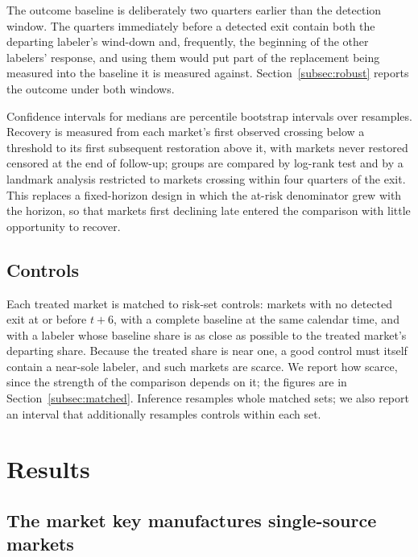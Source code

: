 \documentclass[pdflatex,sn-vancouver-num,Numbered]{sn-jnl}
\begin{document}
The outcome baseline is deliberately two quarters earlier than the detection window. The
quarters immediately before a detected exit contain both the departing labeler's wind-down and,
frequently, the beginning of the other labelers' response, and using them would put part of the
replacement being measured into the baseline it is measured against. Section~\ref{subsec:robust}
reports the outcome under both windows.

Confidence intervals for medians are percentile bootstrap intervals over \nBootDraws resamples.
Recovery is measured from each market's first observed crossing below a threshold to its first
subsequent restoration above it, with markets never restored censored at the end of follow-up;
groups are compared by log-rank test and by a landmark analysis restricted to markets crossing
within four quarters of the exit. This replaces a fixed-horizon design in which the at-risk
denominator grew with the horizon, so that markets first declining late entered the comparison
with little opportunity to recover.

\subsection{Controls}\label{subsec:controls}

Each treated market is matched to risk-set controls: markets with no detected exit at or before
$t+6$, with a complete baseline at the same calendar time, and with a labeler whose baseline
share is as close as possible to the treated market's departing share. Because the treated share
is near one, a good control must itself contain a near-sole labeler, and such markets are scarce.
We report how scarce, since the strength of the comparison depends on it; the figures are in
Section~\ref{subsec:matched}. Inference resamples whole matched sets; we also report an interval
that additionally resamples controls within each set.

\section{Results}\label{sec:results}

\subsection{The market key manufactures single-source markets}\label{subsec:defect}
\end{document}
